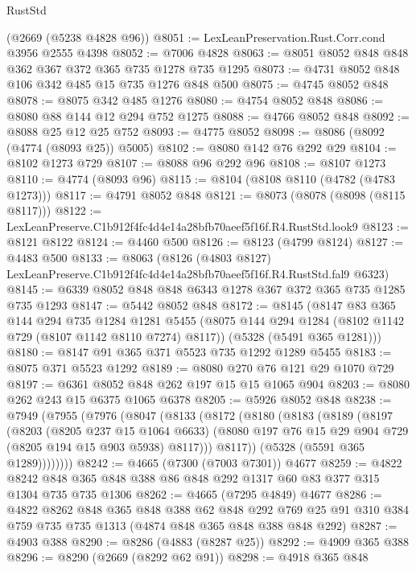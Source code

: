 \begin{lexlean}{RustStd}
\begin{coremodule}
    (@2669 (@5238 @4828 @96))
@8051 := LexLeanPreservation.Rust.Corr.cond @3956 @2555 @4398
@8052 := @7006 @4828
@8063 := @8051 @8052 @848 @848 @362 @367 @372 @365 @735 @1278 @735 @1295
@8073 := @4731 @8052 @848 @106 @342 @485 @15 @735 @1276 @848 @500
@8075 := @4745 @8052 @848
@8078 := @8075 @342 @485 @1276
@8080 := @4754 @8052 @848
@8086 := @8080 @88 @144 @12 @294 @752 @1275
@8088 := @4766 @8052 @848
@8092 := @8088 @25 @12 @25 @752
@8093 := @4775 @8052
@8098 := @8086 (@8092 (@4774 (@8093 @25)) @5005)
@8102 := @8080 @142 @76 @292 @29
@8104 := @8102 @1273 @729
@8107 := @8088 @96 @292 @96
@8108 := @8107 @1273
@8110 := @4774 (@8093 @96)
@8115 := @8104 (@8108 @8110 (@4782 (@4783 @1273)))
@8117 := @4791 @8052 @848
@8121 := @8073 (@8078 (@8098 (@8115 @8117)))
@8122 := LexLeanPreserve.C1b912f4fc4d4e14a28bfb70aeef5f16f.R4.RustStd.look9
@8123 := @8121 @8122
@8124 := @4460 @500
@8126 := @8123 (@4799 @8124)
@8127 := @4483 @500
@8133 := @8063
    (@8126 (@4803 @8127) LexLeanPreserve.C1b912f4fc4d4e14a28bfb70aeef5f16f.R4.RustStd.fal9 @6323)
@8145 := @6339 @8052 @848 @848 @6343 @1278 @367 @372 @365 @735 @1285 @735 @1293
@8147 := @5442 @8052 @848
@8172 := @8145
    (@8147
      @83
      @365
      @144
      @294
      @735
      @1284
      @1281
      @5455
      (@8075 @144 @294 @1284 (@8102 @1142 @729 (@8107 @1142 @8110 @7274) @8117))
      (@5328 (@5491 @365 @1281)))
@8180 := @8147 @91 @365 @371 @5523 @735 @1292 @1289 @5455
@8183 := @8075 @371 @5523 @1292
@8189 := @8080 @270 @76 @121 @29 @1070 @729
@8197 := @6361 @8052 @848 @262 @197 @15 @15 @1065 @904
@8203 := @8080 @262 @243 @15 @6375 @1065 @6378
@8205 := @5926 @8052 @848
@8238 := @7949
    (@7955
      (@7976
        (@8047
          (@8133
            (@8172
              (@8180
                (@8183
                  (@8189
                    (@8197
                      (@8203
                        (@8205 @237 @15 @1064 @6633)
                        (@8080 @197 @76 @15 @29 @904 @729 (@8205 @194 @15 @903 @5938) @8117)))
                    @8117))
                (@5328 (@5591 @365 @1289))))))))
@8242 := @4665 (@7300 (@7003 @7301)) @4677
@8259 := @4822 @8242 @848 @365 @848 @388 @86 @848 @292 @1317 @60 @83 @377 @315 @1304 @735 @735 @1306
@8262 := @4665 (@7295 @4849) @4677
@8286 := @4822
    @8262
    @848
    @365
    @848
    @388
    @62
    @848
    @292
    @769
    @25
    @91
    @310
    @384
    @759
    @735
    @735
    @1313
    (@4874 @848 @365 @848 @388 @848 @292)
@8287 := @4903 @388
@8290 := @8286 (@4883 (@8287 @25))
@8292 := @4909 @365 @388
@8296 := @8290 (@2669 (@8292 @62 @91))
@8298 := @4918 @365 @848

\end{coremodule}
\end{lexlean}
